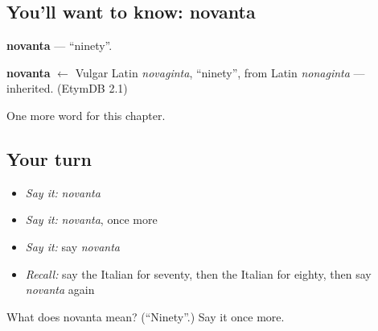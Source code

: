 \subsection*{You'll want to know: novanta}
\textbf{novanta} — \textquotedblleft{}ninety\textquotedblright{}.

\begin{cousinweb}
\textbf{novanta} $\leftarrow$ Vulgar Latin \emph{novaginta}, \textquotedblleft{}ninety\textquotedblright{}, from Latin \emph{nonaginta} — inherited. (EtymDB 2.1)
\end{cousinweb}

\begin{grammarlens}[title={What you've built}]
One more word for this chapter.
\end{grammarlens}

\subsection*{Your turn}
\begin{itemize}
\raggedright
  \item \emph{Say it:} \emph{novanta}
  \item \emph{Say it:} \emph{novanta}, once more
  \item \emph{Say it:} say \emph{novanta}
  \item \emph{Recall:} say the Italian for seventy, then the Italian for eighty, then say \emph{novanta} again
\end{itemize}

\begin{tcolorbox}[breakable,colback=teal!4,colframe=teal!35!black,title={Before you move on}]
What does novanta mean? (\textquotedblleft{}Ninety\textquotedblright{}.) Say it once more.
\end{tcolorbox}
